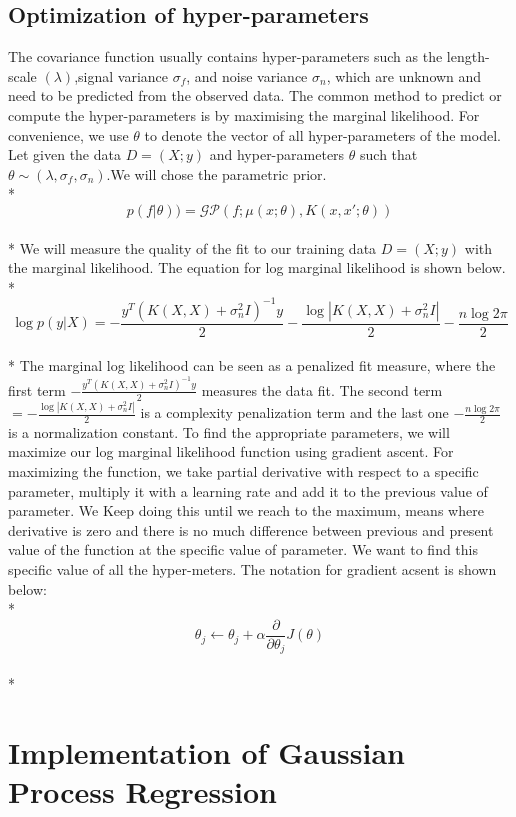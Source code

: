 \documentclass{article}
\begin{document}
\subsection{Optimization of hyper-parameters}
The covariance function usually contains hyper-parameters such as the length-scale $(\lambda)$,signal variance $\sigma_f$, and noise variance $\sigma_n$, which are unknown and need to be predicted from the observed data. The common method to predict or compute the hyper-parameters is by maximising the marginal likelihood. For convenience, we use $\theta$  to denote the vector of
all hyper-parameters of the model. Let given the data $D={(X; y)}$ and hyper-parameters $\theta$ such that $\theta\sim(\lambda,\sigma_f,\sigma_n)$.We will chose the parametric prior.
\\*
$${p(f|\theta))}= \mathcal{GP}{\left(f;\mu(x;\theta),K(x,x';\theta)\right)}$$
\\*
We will measure the quality of the fit to our training data $D = (X; y)$ with the marginal likelihood. The equation for log marginal likelihood is shown below. 
\\*
$$\log{p(y|X)} = -\frac{{y^T}{(K(X,X)+\sigma_n^2I)^{-1}}{y}}{2} - \frac{\log|{K(X,X)+\sigma_n^2I}|}{2} - \frac{n\log{2\pi}}{2}$$
\\*
The marginal log likelihood can be seen as a penalized fit measure,
where the first term $-\frac{{y^T}{(K(X,X)+\sigma_n^2I)^{-1}}{y}}{2}$ measures the data fit. The second term $=-\frac{\log|{K(X,X)+\sigma_n^2I}|}{2}$ is a complexity penalization term and the last one $- \frac{n\log{2\pi}}{2}$ is a normalization constant.
To find the appropriate parameters, we will maximize our log marginal likelihood function using gradient ascent. For maximizing the function, we take partial derivative with respect to a specific parameter, multiply it with a learning rate and add it to the previous value of parameter. We Keep doing this until we reach to the maximum, means where derivative is zero and there is no much difference between previous and present value of the function at the specific value of parameter. We want to find this specific value of all the hyper-meters. The notation for gradient acsent is shown below:
\\*
$$\theta_j \leftarrow \theta_j+\alpha \frac{\partial}{\partial \theta_{j}} J(\theta)$$
\\*
\section{Implementation of Gaussian Process Regression}
\end{document}
